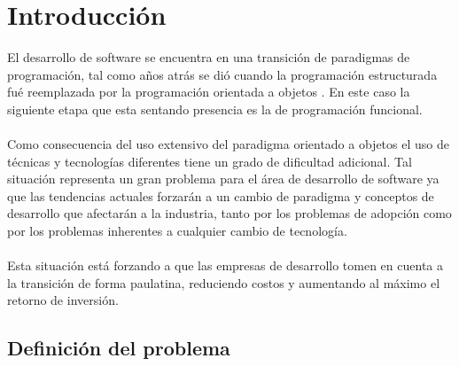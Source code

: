 \chapter*{Introducci\'on}

  El desarrollo de software se encuentra en una transici\'on de paradigmas 
  de programaci\'on,  tal como a\~nos
  atr\'as se di\'o cuando  la programaci\'on estructurada fu\'e reemplazada 
  por la programaci\'on orientada a objetos \citep{roadStructuredToOO}. En este caso la siguiente  
  etapa que esta sentando presencia es la de programaci\'on funcional.
\\
\\  
  Como consecuencia del uso extensivo del paradigma orientado a objetos
  el uso de t\'ecnicas y tecnolog\'ias diferentes tiene un grado de dificultad
  adicional. Tal situaci\'on representa un gran problema 
  para el  \'area de desarrollo de software ya que las tendencias actuales 
  forzar\'an a un cambio de paradigma y conceptos de desarrollo 
  que afectar\'an a la industria, tanto por los problemas de adopci\'on
  como por los problemas inherentes a cualquier cambio de tecnolog\'ia.
\\ 
\\ 
  Esta situaci\'on est\'a forzando a que las empresas de desarrollo tomen en cuenta a la 
  transici\'on de forma paulatina, reduciendo costos y aumentando al m\'aximo
  el retorno de inversi\'on.

\section*{Definici\'on del problema}
  
